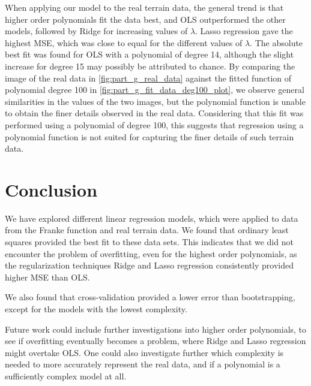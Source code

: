 \documentclass[12pt]{article}
\begin{document}
When applying our model to the real terrain data, the general trend is that higher order polynomials fit the data best, and OLS outperformed the other models, followed by Ridge for increasing values of $\lambda$. Lasso regression gave the highest MSE, which was close to equal for the different values of $\lambda$. The absolute best fit was found for OLS with a polynomial of degree 14, although the slight increase for degree 15 may possibly be attributed to chance. By comparing the image of the real data in \autoref{fig:part_g_real_data} against the fitted function of polynomial degree 100 in \autoref{fig:part_g_fit_data_deg100_plot}, we observe general similarities in the values of the two images, but the polynomial function is unable to obtain the finer details observed in the real data. Considering that this fit was performed using a polynomial of degree 100, this suggests that regression using a polynomial function is not suited for capturing the finer details of such terrain data.

\section{Conclusion} \label{sec:conclusion}
We have explored different linear regression models, which were applied to data from the Franke function and real terrain data. We found that ordinary least squares provided the best fit to these data sets. This indicates that we did not encounter the problem of overfitting, even for the highest order polynomials, as the regularization techniques Ridge and Lasso regression consistently provided higher MSE than OLS.  

We also found that cross-validation provided a lower error than bootstrapping, except for the models with the lowest complexity. 

Future work could include further investigations into higher order polynomials, to see if overfitting eventually becomes a problem, where Ridge and Lasso regression might overtake OLS.
One could also investigate further which complexity is needed to more accurately represent the real data, and if a polynomial is a sufficiently complex model at all. 

\printbibliography
\end{document}
